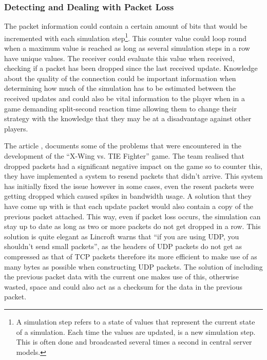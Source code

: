 \subsubsection{Detecting and Dealing with Packet Loss}
The packet information could contain a certain amount of bits that would be incremented with each simulation step\footnote{A simulation step refers to a state of values that represent the current state of a simulation. Each time the values are updated, is a new simulation step. This is often done and broadcasted several times a second in central server models.}. This counter value could loop round when a maximum value is reached as long as several simulation steps in a row have unique values. The receiver could evaluate this value when received, checking if a packet has been dropped since the last received update. Knowledge about the quality of the connection could be important information when determining how much of the simulation has to be estimated between the received updates and could also be vital information to the player when in a game demanding split-second reaction time allowing them to change their strategy with the knowledge that they may be at a disadvantage against other players.

The article , documents some of the problems that were encountered in the development of the ``X-Wing vs. TIE Fighter'' game. The team realised that dropped packets had a significant negative impact on the game so to counter this, they have implemented a system to resend packets that didn't arrive. This system has initially fixed the issue however in some cases, even the resent packets were getting dropped which caused spikes in bandwidth usage. A solution that they have come up with is that each update packet would also contain a copy of the previous packet attached. This way, even if packet loss occurs, the simulation can stay up to date as long as two or more packets do not get dropped in a row. This solution is quite elegant as Lincroft warns that ``if you are using UDP, you shouldn’t send small packets'', as the headers of UDP packets do not get as compressed as that of TCP packets therefore its more efficient to make use of as many bytes as possible when constructing UDP packets. The solution of including the previous packet data with the current one makes use of this, otherwise wasted, space and could also act as a checksum for the data in the previous packet.

\newpage

